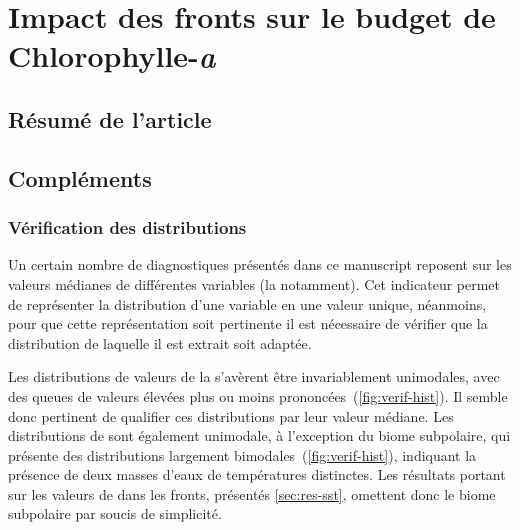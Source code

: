 
\chapter{Impact des fronts sur le budget de Chlorophylle-\textit{a}}
\addChpLof
\label{chp:res-chl}
\graphicspath{{resources/res_chl}}

\minitoc%


\section{Résumé de l'article}
\label{sec:resume-article}


\insertArticle{}

\section{Compléments}
\label{sec:complements-chl}
\suppressfloats[t]

\subsection{Vérification des distributions}
\label{sec:verif-hist}

Un certain nombre de diagnostiques présentés dans ce manuscript reposent sur les valeurs médianes de différentes variables (la  notamment).
Cet indicateur permet de représenter la distribution d'une variable en une valeur unique, néanmoins, pour que cette représentation soit pertinente il est nécessaire de vérifier que la distribution de laquelle il est extrait soit adaptée.

Les distributions de valeurs de la  s'avèrent être invariablement unimodales, avec des queues de valeurs élevées plus ou moins prononcées~(\cref{fig:verif-hist}).
Il semble donc pertinent de qualifier ces distributions par leur valeur médiane.
Les distributions de  sont également unimodale, à l'exception du biome subpolaire, qui présente des distributions largement bimodales~(\cref{fig:verif-hist}), indiquant la présence de deux masses d'eaux de températures distinctes.
Les résultats portant sur les valeurs de  dans les fronts, présentés \cref{sec:res-sst}, omettent donc le biome subpolaire par soucis de simplicité.

